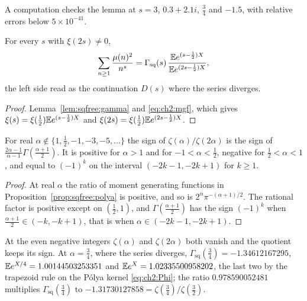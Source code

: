 A computation checks the lemma at $s=3$, $0.3+2.1i$, $\frac34$ and $-1.5$, with relative errors below $5\times10^{-41}$.

\begin{proposition}\label{prop:sqfree:polya}
For every $s$ with $\xi(2s)\ne0$,
\[
\sum_{n\ge1}\frac{\mu(n)^2}{n^s}=\Gamma_{\mathrm{sq}}(s)\,\frac{\mathbb{E} e^{(s-\frac12)X}}{\mathbb{E} e^{(2s-\frac12)X}} ,
\]
the left side read as the continuation $D(s)$ where the series diverges.
\end{proposition}

\begin{proof}
Lemma~\ref{lem:sqfree:gamma} and \eqref{eq:ch2:mgf}, which gives $\xi(s)=\xi(\frac12)\mathbb{E} e^{(s-\frac12)X}$ and $\xi(2s)=\xi(\frac12)\mathbb{E} e^{(2s-\frac12)X}$.
\end{proof}

\begin{corollary}\label{cor:sqfree:sign}
For real $\alpha\notin\{1,\frac12,-1,-3,-5,\dots\}$ the sign of $\zeta(\alpha)/\zeta(2\alpha)$ is the sign of $\frac{2\alpha-1}{\alpha-1}\Gamma(\frac{\alpha+1}2)$. It is positive for $\alpha>1$ and for $-1<\alpha<\frac12$, negative for $\frac12<\alpha<1$, and equal to $(-1)^k$ on the interval $(-2k-1,-2k+1)$ for $k\ge1$.
\end{corollary}

\begin{proof}
At real $\alpha$ the ratio of moment generating functions in Proposition~\ref{prop:sqfree:polya} is positive, and so is $2^\alpha\pi^{-(\alpha+1)/2}$. The rational factor is positive except on $(\frac12,1)$, and $\Gamma(\frac{\alpha+1}2)$ has the sign $(-1)^k$ when $\frac{\alpha+1}2\in(-k,-k+1)$, that is when $\alpha\in(-2k-1,-2k+1)$.
\end{proof}

At the even negative integers $\zeta(\alpha)$ and $\zeta(2\alpha)$ both vanish and the quotient keeps its sign. At $\alpha=\frac34$, where the series diverges, $\Gamma_{\mathrm{sq}}(\frac34)=-1.34612167295$, $\mathbb{E} e^{X/4}=1.00144503253351$ and $\mathbb{E} e^X=1.02335500958202$, the last two by the trapezoid rule on the P\'olya kernel \eqref{eq:ch2:Phi}; the ratio $0.978590052481$ multiplies $\Gamma_{\mathrm{sq}}(\frac34)$ to $-1.31730127858=\zeta(\frac34)/\zeta(\frac32)$.

